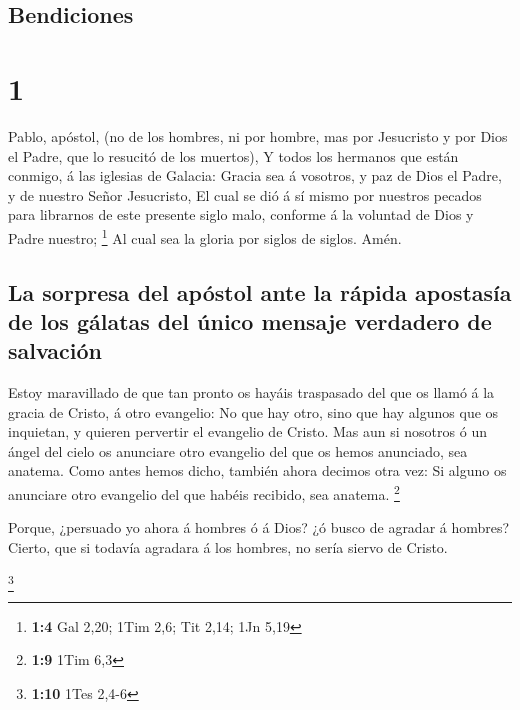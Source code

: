\hypertarget{bendiciones}{%
\subsection{Bendiciones}\label{bendiciones}}

\hypertarget{section}{%
\section{1}\label{section}}

 Pablo, apóstol, (no de los hombres, ni por hombre, mas por
Jesucristo y por Dios el Padre, que lo resucitó de los muertos),
 Y todos los hermanos que están conmigo, á las iglesias de
Galacia:  Gracia sea á vosotros, y paz de Dios el Padre, y
de nuestro Señor Jesucristo,  El cual se dió á sí mismo por
nuestros pecados para librarnos de este presente siglo malo, conforme á
la voluntad de Dios y Padre nuestro; \footnote{\textbf{1:4} Gal 2,20;
  1Tim 2,6; Tit 2,14; 1Jn 5,19}  Al cual sea la gloria por
siglos de siglos. Amén.

\hypertarget{la-sorpresa-del-apuxf3stol-ante-la-ruxe1pida-apostasuxeda-de-los-guxe1latas-del-uxfanico-mensaje-verdadero-de-salvaciuxf3n}{%
\subsection{La sorpresa del apóstol ante la rápida apostasía de los
gálatas del único mensaje verdadero de
salvación}\label{la-sorpresa-del-apuxf3stol-ante-la-ruxe1pida-apostasuxeda-de-los-guxe1latas-del-uxfanico-mensaje-verdadero-de-salvaciuxf3n}}

 Estoy maravillado de que tan pronto os hayáis traspasado
del que os llamó á la gracia de Cristo, á otro evangelio: 
No que hay otro, sino que hay algunos que os inquietan, y quieren
pervertir el evangelio de Cristo.  Mas aun si nosotros ó un
ángel del cielo os anunciare otro evangelio del que os hemos anunciado,
sea anatema.  Como antes hemos dicho, también ahora decimos
otra vez: Si alguno os anunciare otro evangelio del que habéis recibido,
sea anatema. \footnote{\textbf{1:9} 1Tim 6,3}

 Porque, ¿persuado yo ahora á hombres ó á Dios? ¿ó busco de
agradar á hombres? Cierto, que si todavía agradara á los hombres, no
sería siervo de Cristo.

\footnote{\textbf{1:10} 1Tes 2,4-6}

